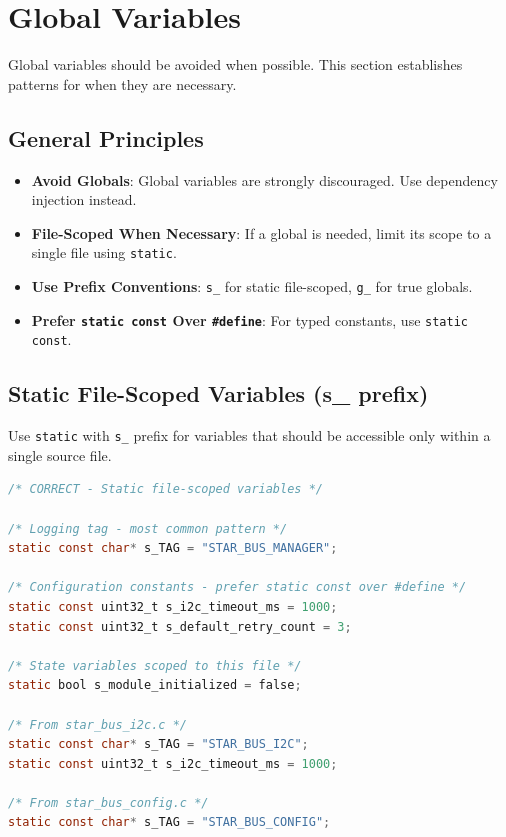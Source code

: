 \section{Global Variables}

Global variables should be avoided when possible. This section establishes patterns for when they are necessary.

\subsection{General Principles}

\begin{itemize}
    \item \textbf{Avoid Globals}: Global variables are strongly discouraged. Use dependency injection instead.
    \item \textbf{File-Scoped When Necessary}: If a global is needed, limit its scope to a single file using \texttt{static}.
    \item \textbf{Use Prefix Conventions}: \texttt{s\_} for static file-scoped, \texttt{g\_} for true globals.
    \item \textbf{Prefer \texttt{static const} Over \texttt{\#define}}: For typed constants, use \texttt{static const}.
\end{itemize}

\subsection{Static File-Scoped Variables (s\_ prefix)}

Use \texttt{static} with \texttt{s\_} prefix for variables that should be accessible only within a single source file.

\begin{lstlisting}[language=C]
/* CORRECT - Static file-scoped variables */

/* Logging tag - most common pattern */
static const char* s_TAG = "STAR_BUS_MANAGER";

/* Configuration constants - prefer static const over #define */
static const uint32_t s_i2c_timeout_ms = 1000;
static const uint32_t s_default_retry_count = 3;

/* State variables scoped to this file */
static bool s_module_initialized = false;

/* From star_bus_i2c.c */
static const char* s_TAG = "STAR_BUS_I2C";
static const uint32_t s_i2c_timeout_ms = 1000;

/* From star_bus_config.c */
static const char* s_TAG = "STAR_BUS_CONFIG";
\end{lstlisting}

